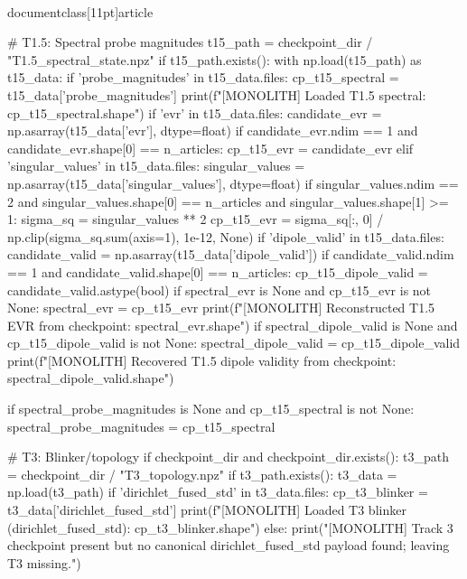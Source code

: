 \\documentclass[11pt]{article}
\begin{document}
\begin{CodeBlock}
        # T1.5: Spectral probe magnitudes
        t15_path = checkpoint_dir / "T1.5_spectral_state.npz"
        if t15_path.exists():
            with np.load(t15_path) as t15_data:
                if 'probe_magnitudes' in t15_data.files:
                    cp_t15_spectral = t15_data['probe_magnitudes']
                    print(f"[MONOLITH] Loaded T1.5 spectral: {cp_t15_spectral.shape}")
                if 'evr' in t15_data.files:
                    candidate_evr = np.asarray(t15_data['evr'], dtype=float)
                    if candidate_evr.ndim == 1 and candidate_evr.shape[0] == n_articles:
                        cp_t15_evr = candidate_evr
                elif 'singular_values' in t15_data.files:
                    singular_values = np.asarray(t15_data['singular_values'], dtype=float)
                    if singular_values.ndim == 2 and singular_values.shape[0] == n_articles and singular_values.shape[1] >= 1:
                        sigma_sq = singular_values ** 2
                        cp_t15_evr = sigma_sq[:, 0] / np.clip(sigma_sq.sum(axis=1), 1e-12, None)
                if 'dipole_valid' in t15_data.files:
                    candidate_valid = np.asarray(t15_data['dipole_valid'])
                    if candidate_valid.ndim == 1 and candidate_valid.shape[0] == n_articles:
                        cp_t15_dipole_valid = candidate_valid.astype(bool)
                if spectral_evr is None and cp_t15_evr is not None:
                    spectral_evr = cp_t15_evr
                    print(f"[MONOLITH] Reconstructed T1.5 EVR from checkpoint: {spectral_evr.shape}")
                if spectral_dipole_valid is None and cp_t15_dipole_valid is not None:
                    spectral_dipole_valid = cp_t15_dipole_valid
                    print(f"[MONOLITH] Recovered T1.5 dipole validity from checkpoint: {spectral_dipole_valid.shape}")

    if spectral_probe_magnitudes is None and cp_t15_spectral is not None:
        spectral_probe_magnitudes = cp_t15_spectral

    # T3: Blinker/topology
    if checkpoint_dir and checkpoint_dir.exists():
        t3_path = checkpoint_dir / "T3_topology.npz"
        if t3_path.exists():
            t3_data = np.load(t3_path)
            if 'dirichlet_fused_std' in t3_data.files:
                cp_t3_blinker = t3_data['dirichlet_fused_std']
                print(f"[MONOLITH] Loaded T3 blinker (dirichlet_fused_std): {cp_t3_blinker.shape}")
            else:
                print("[MONOLITH] Track 3 checkpoint present but no canonical dirichlet_fused_std payload found; leaving T3 missing.")


\end{CodeBlock}
\end{document}
